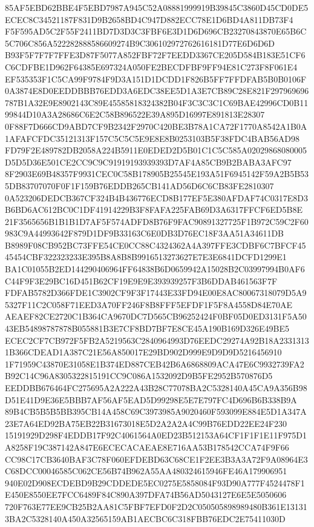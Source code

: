 \documentclass[UTF8,fontset=fandol,zihao=-4,a4paper]{ctexart}
\begin{document}
{{85AF5EBD62BBE4F5EBD7987A945C52A08881999919B39845C3860D45CD0DE5ECEC8C34521187F831D9B2658BD4C947D882ECC78E1D6BD4A811DB73F4
F5F595AD5C2F55F2411BD7D3D3C3FBF6E3D1D6D696CB23270843870E65B6C5C706C856A522282888586609274B9C306102972762616181D77E6D6D6D
B93F5F7F7F7FFE3D87F5077A852FBF72F7EEDD3367CE205D584B183E51CF6C6CDFBE1D962F64385E697324A050FE2BECDFBF9FF94E81C273F8F061E4
EF535353F1C5CA99F9784F9D3A151D1DCDD1F826B5FF7FFDFAB5B0B0106F0A3874E8D0EEDDBBB76EDD3A6EDC38EE5D1A3E7CB89C28E821F297969696
787B1A32E9E8902143C89E45585818324382B04F3C3C3C1C69BAE42996CD0B1199844D10A3A28686C6E2C58B896522E39A895D16997E891813E28307
0F88F7D666CD9ABD7CF9B2342F2970C420BE3B78A1CA72F1770A8542A1B0A1AFAFCFDC35121313F157C5C5C5E9E8E8B0253103B5F38FDC4BAB56AD98
FD79F2E489782DB2058A224B5911E0EDED2D5B01C1C5C585A02029868080005D5D5D36E501CE2CC9C9C91919193939393D7AF4A85CB9B2BABA3AFC97
8F2903E69B48357F9931CEC0C58B178905B25545E193A51F6945142F59A2B5B535DB83707070F0F1F159B76EDDB265CB141AD56D6C6CB83FE2810307
0A523206DEDCB367CF324B4B436776ECD8B177EF5E380AFDAF74C0317E8D3B6BD6AC612BC0C1DF41914229B3F8FAFA225FAB69D3A6317FFCF6ED5B8E
21F3565656B1B1B1D7AF5F574ADFD8B76F9FAC90891327725F1B972C59C2F60983C9A44993642F879D1DF9B33163C6E0DB3D76EC18F3AA51A34611DB
B8989F08CB952BC73FFE54CE0CC88C4324362A4A397FFE3CDBF6C7BFCF4545454CBF322323233E395B8A8B8B9916513273627E7E3E6841DCFD1299E1
BA1C01055B2ED144290406964FF64838B6D0659942A15028B2C03997994B0AF6C44F9F3E29BC16D451B62CF19E9E9E393939257F3B6DDAB461563F7F
FDFAB5782D366FDE1C3902CF9F3F17443E33FD94E00E8AC80067318079D5A95327F11C2C058F71EED3A70FF246F8B8FFF5EFDF1F5F8A4558D84E70AE
AEAEF82CE2720C1B364CA9670DC7D565CB96252424F0BF05D0ED3131F5A5043EB54898787878B055881B3E7CF8BD7BF7E8CE45A190B169D326E49BE5
ECEC2CF7CB972F5FB2A5219563C2840964993D76EEDC29274A92B18A23313131B366CDEAD1A387C21E56A850017E29BD902D999E9D9D9D5216456910
1F71959C43870E31058E1B374ED887CEB42B6A6868809ACA47E6C9932739FA2B92C14C96A8305322815191CC9C086A1532092D9B5FE2952B570876D5
EEDDBB676464FC275695A2A222A43B28C77078BA2C5328140A45CA9A356B98D51E41D9E36E5BBB7AF56AF5EAD5D99298E5E7E797FC4D696B6B338B9A
89B4CB5B5B5BB395CB14A458C69C3973985A9020460F593099E884E5D1A347A23E7A64ED92BA75EB22B31673018E5D2A2A2A4C99B76EDD22EE24F230
15191929D298F4EDDB17F92C4061564A0ED23B512153A64CF1F1F1E11F975D1A8258F19C387142A847E6ECECACAEAE8E716AA53B178542CCA74F9F66
CC98C17CB3640BAF3C78F060EFDEBD63C68CE1F2EE3B3A3A72F9A08964E3C68DCC00046585C062CE56B74B962A55AA480324615946FE46A179906951
940E02D908ECDEBD9B29CDDEDE5EC0275E5858084F93D90A777F4524478F1E450E8550EE7FCC6489F84C890A397DFA74B56AD5043127E6E5E5050606
720F763E77EE9CB25B2AA81C5FBF7EFD0F2D2C050505898989480B361E131313BA2C5328140A450A32565159AB1AECBC6C318FBB76EDC2E75411030D
}}
\end{document}
